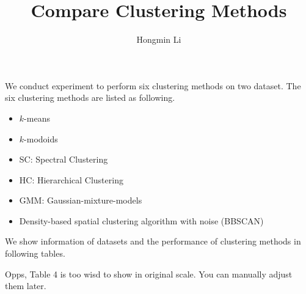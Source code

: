 \documentclass[a4paper,10pt]{article}
\begin{document}
    \title{Compare Clustering Methods}
    \maketitle
    \begin{center}
        \author{Hongmin Li}
    \end{center}

    We conduct experiment to perform six clustering methods on two dataset.
    The six clustering methods are listed as following.
    \begin{itemize}
        \item $k$-means
        \item $k$-modoids
        \item SC: Spectral Clustering
        \item HC: Hierarchical Clustering
        \item GMM: Gaussian-mixture-models
        \item Density-based spatial clustering algorithm with noise (BBSCAN)
    \end{itemize}
    
    We show information of datasets and the performance of clustering methods in following tables.

    Opps, Table 4 is too wisd to show in original scale.
    You can manually adjust them later. 

    \begin{center}

            
            
            
            
    \end{center}
    
\end{document}
